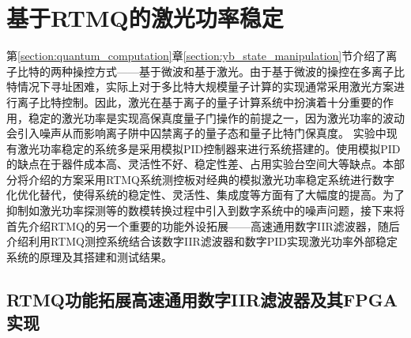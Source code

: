 \section[基于RTMQ的激光功率稳定]{基于RTMQ的激光功率稳定\label{section:laser_power_locking}}
第\ref{section:quantum_computation}章\ref{section:yb_state_manipulation}节介绍了离子比特的两种操控方式——基于微波和基于激光。由于基于微波的操控在多离子比特情况下寻址困难，实际上对于多比特大规模量子计算的实现通常采用激光方案进行离子比特控制。因此，激光在基于离子的量子计算系统中扮演着十分重要的作用，稳定的激光功率是实现高保真度量子门操作的前提之一，因为激光功率的波动会引入噪声从而影响离子阱中囚禁离子的量子态和量子比特门保真度\cite[]{Blums_Scarabel_Shimizu_Ghadimi_Connell_Händel_Norton_Bridge_Kielpinski_Lobino_et_al_2020}。
实验中现有激光功率稳定的系统多是采用模拟PID控制器来进行系统搭建的。使用模拟PID的缺点在于器件成本高、灵活性不好、稳定性差、占用实验台空间大等缺点。本部分将介绍的方案采用RTMQ系统测控板对经典的模拟激光功率稳定系统进行数字化优化替代，使得系统的稳定性、灵活性、集成度等方面有了大幅度的提高。为了抑制如激光功率探测等的数模转换过程中引入到数字系统中的噪声问题，接下来将首先介绍RTMQ的另一个重要的功能外设拓展——高速通用数字IIR滤波器，随后介绍利用RTMQ测控系统结合该数字IIR滤波器和数字PID实现激光功率外部稳定系统的原理及其搭建和测试结果。

\subsection[RTMQ功能拓展高速通用数字IIR滤波器及其FPGA实现]{RTMQ功能拓展高速通用数字IIR滤波器及其FPGA实现\label{section:digital_iir}}



